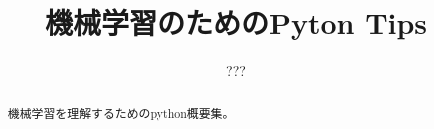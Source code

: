 \documentclass[a4paper,11pt,dvidpdfmx,uplatex]{jsreport}
\title{機械学習のためのPyton Tips}
\author{???}
\begin{document}
\maketitle

\begin{abstract}
  機械学習を理解するためのpython概要集。
\end{abstract}



\appendix

\end{document}
